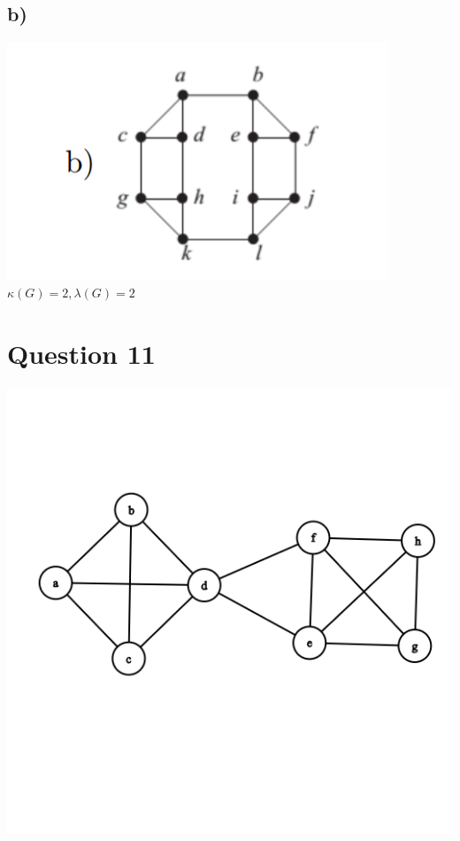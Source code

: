 \documentclass{article}
\begin{document}
\subsection*{b)}
\includegraphics[]{Question 10/connectivity_10.b.png}
\newline
$ \kappa(G) = 2, \lambda(G) = 2 $

\section*{Question 11}
\includegraphics[scale = 0.5]{Question 11/connectivity_11.png}
\end{document}
